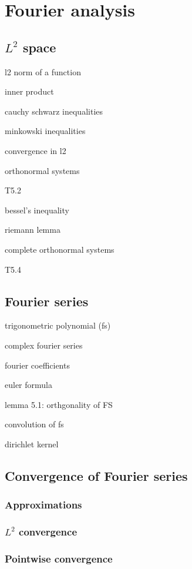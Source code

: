 \documentclass{article}
\begin{document}
\newpage

\section{Fourier analysis}

\subsection{$L^2$ space}
l2 norm of a function

inner product

cauchy schwarz inequalities

minkowski inequalities

convergence in l2

orthonormal systems

T5.2

bessel's inequality

riemann lemma

complete orthonormal systems

T5.4

\subsection{Fourier series}

trigonometric polynomial (fs)

complex fourier series

fourier coefficients

euler formula

lemma 5.1: orthgonality of FS

convolution of fs

dirichlet kernel

\subsection{Convergence of Fourier series}

\subsubsection{Approximations}

\subsubsection{$L^2$ convergence}

\subsubsection{Pointwise convergence}
\end{document}
